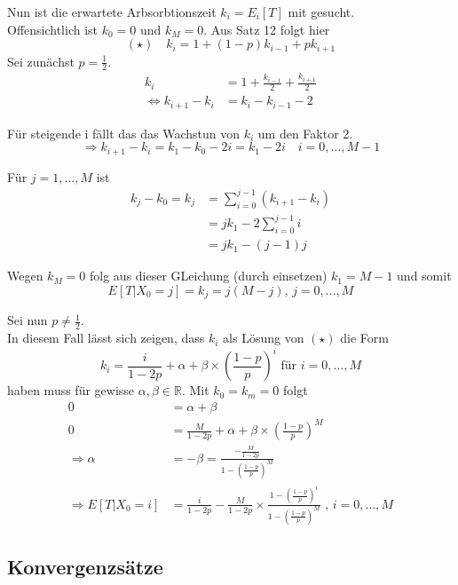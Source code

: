\documentclass[a4paper,12pt]{article}
\begin{document}
\begin{tcolorbox}[breakable, colframe=blue, colback=white, title=Beispiel 9 (Fortsetzung)]
Nun ist die erwartete Arbsorbtionszeit $k_i =E_i[T]$ mit gesucht.\\
Offensichtlich ist $k_0 = 0$ und $k_M = 0$. Aus Satz 12 folgt hier
$$
(\star) \quad k_i = 1+ (1-p)k_{i-1} + pk_{i+1} 
$$
Sei zunächst $p = \frac{1}{2}$.
\begin{align*}
k_i & = 1 + \frac{k_{i-1}}{2} + \frac{k_{i+1}}{2} \\
\Leftrightarrow k_{i+1} - k_i &= k_i - k_{i-1} -2 
\end{align*}

Für steigende i fällt das das Wachstun von $k_i$ um den Faktor 2. 
$$
\Rightarrow k_{i+1} - k_i= k_1 - k_0 - 2i = k_1 - 2i \quad i = 0, ..., M-1
$$

Für $j = 1, ..., M$ ist
\begin{align*}
k_j - k_0 = k_j &= \sum_{i=0}^{j-1}(k_{i+1}-k_i)\\
& = jk_1 - 2\sum_{i=0}^{j-1}i \\
& = jk_1 - (j-1)j 
\end{align*}

Wegen $k_M = 0$ folg aus dieser GLeichung (durch einsetzen) $k_1 = M-1$ und somit
$$
E[T|X_0 = j] = k_j = j(M-j) \text{, } j= 0,..., M
$$

Sei nun $p \neq \frac{1}{2}$.\\
In diesem Fall lässt sich zeigen, dass $k_i$ als Lösung von $(\star)$ die Form
$$
k_i = \frac{i}{1-2p}+ \alpha + \beta \times \left(\frac{1-p}{p}\right)^i \text{ für } i=0,...,M 
$$
haben muss für gewisse $\alpha, \beta \in \mathbb{R}$.
Mit $k_0 = k_m = 0$ folgt
\begin{align*}
0 & = \alpha + \beta \\
0 & = \frac{M}{1-2p} + \alpha + \beta \times \left(\frac{1-p}{p}\right)^M\\
\Rightarrow \alpha & =- \beta = \frac{-\frac{M}{1-2p}}{1- \left(\frac{1-p}{p}\right)^M}\\
\Rightarrow E[T|X_0 = i] & = \frac{i}{1-2p} - \frac{M}{1-2p} \times \frac{1 - \left(\frac{1-p}{p}\right)^i}{1 - \left(\frac{1-p}{p}\right)^M} \text{ , } i = 0, ..., M
\end{align*}
\end{tcolorbox}

\subsection{Konvergenzsätze}
\end{document}
